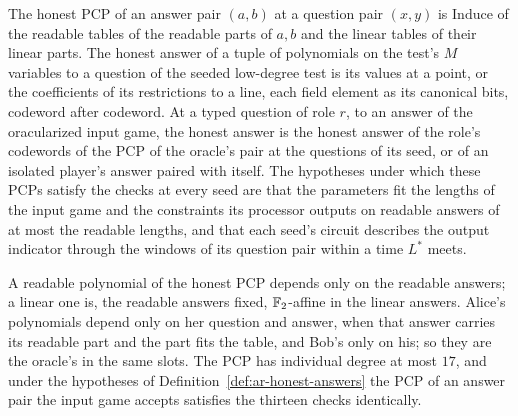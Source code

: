 \begin{definition}
\label{def:ar-honest-answers}
\leanok
The honest PCP of an answer pair $(a, b)$ at a question pair $(x, y)$ is $\mathrm{Induce}$ of the
readable tables of the readable parts of $a, b$ and the linear tables of their linear parts. The
honest answer of a tuple of polynomials on the test's $M$ variables to a question of the seeded
low-degree test is its values at a point, or the coefficients of its restrictions to a line, each
field element as its canonical bits, codeword after codeword. At a typed question of role $r$,
to an answer of the oracularized input game, the honest answer is the honest answer of the role's
codewords of the PCP of the oracle's pair at the questions of its seed, or of an isolated
player's answer paired with itself. The hypotheses under which these PCPs satisfy the checks at
every seed are that the parameters fit the lengths of the input game and the constraints its processor outputs
on readable answers of at most the readable lengths, and that
each seed's circuit describes the output indicator through the windows of its question pair
within a time $L^*$ meets.
\end{definition}

\begin{lemma}
\label{lem:ar-pair-pcp}
\leanok
A readable polynomial of the honest PCP depends only on the readable answers; a linear one is,
the readable answers fixed, $\mathbb{F}_2$-affine in the linear answers. Alice's polynomials depend only
on her question and answer, when that answer carries its readable part and the part fits the
table, and Bob's only on his; so they are the oracle's in the same slots. The PCP has individual
degree at most $17$, and under the hypotheses of Definition~\ref{def:ar-honest-answers} the PCP of
an answer pair the input game accepts satisfies the thirteen checks identically.
\end{lemma}

